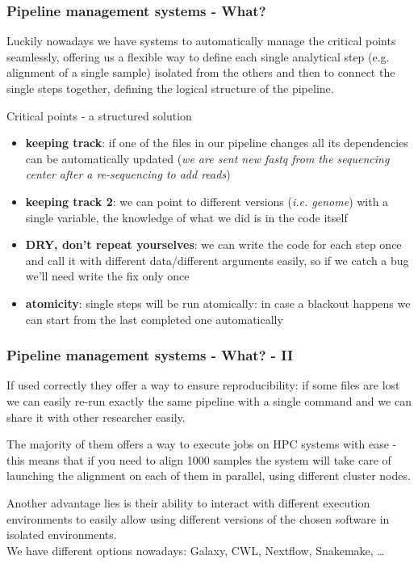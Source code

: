 \documentclass[xcolor=table]{beamer}
\begin{document}
\begin{frame}
\frametitle{Pipeline management systems - What?}
\begin{tiny}
Luckily nowadays we have systems to automatically manage the critical points seamlessly, offering us a flexible way to define each single analytical
step (e.g. alignment of a single sample) isolated from the others and then to connect the single steps together, defining the logical structure of the pipeline.
\end{tiny}
\begin{footnotesize}
\begin{beamerboxesrounded}[upper=upper_box2,lower=lower_box,shadow=true]{Critical points - a structured solution}
\begin{itemize}
\item \textbf{keeping track}: if one of the files in our pipeline changes all its \textcolor{novak}{dependencies} can be automatically updated (\emph{we are sent new fastq from the sequencing center after a re-sequencing to add reads})
\item \textbf{keeping track 2}: we can point to different versions (\emph{i.e. genome}) with a single variable, the \textcolor{novak}{knowledge} of what we did is in the code itself
\item \textbf{DRY, don't repeat yourselves}: we can write the code for each step once and call it with different data/different arguments easily, so if we catch a bug we'll need write the fix only once
\item \textbf{atomicity}: single steps will be run \textcolor{galon}{atomically}: in case a blackout happens we can start from the last completed one automatically
\end{itemize}
\end{beamerboxesrounded}
\end{footnotesize}
\end{frame}

\begin{frame}
\frametitle{Pipeline management systems - What? - II}
If used correctly they offer a way to ensure \textcolor{novak}{reproducibility}: if some files are lost we can easily re-run exactly
the same pipeline with a single command and we can share it with other researcher easily.

The majority of them offers a way to execute jobs on \textcolor{galon}{HPC systems} with ease - this means that if you need
to align 1000 samples the system will take care of launching the alignment on each of them in parallel, using different cluster nodes.

Another advantage lies is their ability to interact with different \textcolor{beer}{execution environments}
to easily allow using different versions of the chosen software in isolated environments.
\\ \vspace{0.5cm}
We have different options nowadays: \textcolor{beer}{Galaxy, CWL,  Nextflow, Snakemake, \ldots}
\end{frame}
\end{document}
